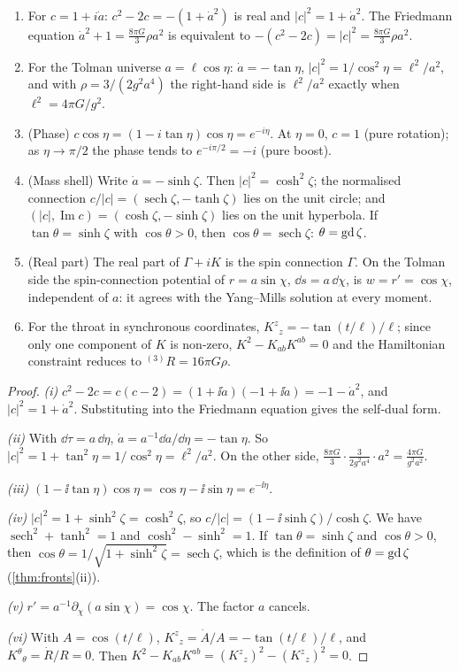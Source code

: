 \begin{theorem}\label{thm:selfdual}\ver\
\begin{enumerate}[label=(\roman*)]
\item For $c=1+i\dot a$: $c^2-2c=-(1+\dot a^2)$ is real and $|c|^2=1+\dot a^2$. The Friedmann equation $\dot a^2+1=\frac{8\pi G}3\rho a^2$ is equivalent to $-(c^2-2c)=|c|^2=\frac{8\pi G}3\rho a^2$.
\item For the Tolman universe $a=\ell\cos\eta$: $\dot a=-\tan\eta$, $|c|^2=1/\cos^2\eta=\ell^2/a^2$, and with $\rho=3/(2g^2a^4)$ the right-hand side is $\ell^2/a^2$ exactly when $\ell^2=4\pi G/g^2$.
\item (Phase) $c\cos\eta=(1-i\tan\eta)\cos\eta=e^{-i\eta}$. At $\eta=0$, $c=1$ (pure rotation); as $\eta\to\pi/2$ the phase tends to $e^{-i\pi/2}=-i$ (pure boost).
\item (Mass shell) Write $\dot a=-\sinh\zeta$. Then $|c|^2=\cosh^2\zeta$; the normalised connection $c/|c|=(\operatorname{sech}\zeta,-\tanh\zeta)$ lies on the unit circle; and $(|c|,\operatorname{Im}c)=(\cosh\zeta,-\sinh\zeta)$ lies on the unit hyperbola. If $\tan\theta=\sinh\zeta$ with $\cos\theta>0$, then $\cos\theta=\operatorname{sech}\zeta$: $\theta=\operatorname{gd}\zeta$.
\item (Real part) The real part of $\Gamma+iK$ is the spin connection $\Gamma$. On the Tolman side the spin-connection potential of $r=a\sin\chi$, $\dd s=a\,\dd\chi$, is $w=r'=\cos\chi$, independent of $a$: it agrees with the Yang--Mills solution at every moment.
\item For the throat in synchronous coordinates, $K^z{}_z=-\tan(t/\ell)/\ell$; since only one component of $K$ is non-zero, $K^2-K_{ab}K^{ab}=0$ and the Hamiltonian constraint reduces to ${}^{(3)}R=16\pi G\rho$.
\end{enumerate}
\end{theorem}
\begin{proof}
\emph{(i)} $c^2-2c=c(c-2)=(1+\ii\dot a)(-1+\ii\dot a)=-1-\dot a^2$, and $|c|^2=1+\dot a^2$. Substituting into the Friedmann equation gives the self-dual form.

\emph{(ii)} With $\dd\tau=a\,\dd\eta$, $\dot a=a^{-1}\dd a/\dd\eta=-\tan\eta$. So $|c|^2=1+\tan^2\eta=1/\cos^2\eta=\ell^2/a^2$. On the other side, $\frac{8\pi G}3\cdot\frac3{2g^2a^4}\cdot a^2=\frac{4\pi G}{g^2a^2}$.

\emph{(iii)} $(1-\ii\tan\eta)\cos\eta=\cos\eta-\ii\sin\eta=e^{-\ii\eta}$.

\emph{(iv)} $|c|^2=1+\sinh^2\zeta=\cosh^2\zeta$, so $c/|c|=(1-\ii\sinh\zeta)/\cosh\zeta$. We have $\operatorname{sech}^2+\tanh^2=1$ and $\cosh^2-\sinh^2=1$. If $\tan\theta=\sinh\zeta$ and $\cos\theta>0$, then $\cos\theta=1/\sqrt{1+\sinh^2\zeta}=\operatorname{sech}\zeta$, which is the definition of $\theta=\operatorname{gd}\zeta$ (\cref{thm:fronts}(ii)).

\emph{(v)} $r'=a^{-1}\partial_\chi(a\sin\chi)=\cos\chi$. The factor $a$ cancels.

\emph{(vi)} With $A=\cos(t/\ell)$, $K^z{}_z=\dot A/A=-\tan(t/\ell)/\ell$, and $K^\theta{}_\theta=\dot R/R=0$. Then $K^2-K_{ab}K^{ab}=(K^z{}_z)^2-(K^z{}_z)^2=0$.
\end{proof}


